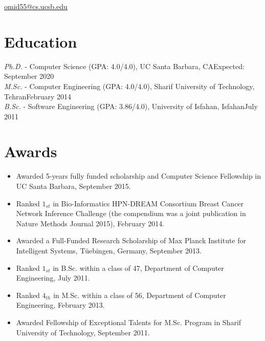 \documentclass[letter]{res}
\begin{document}
\newif \iflong
\longtrue     %

\address{+1 (805) 886 7101}
\address{6520 El Colegio Rd, Apt 2308, Santa Barbara, CA 93106} \href{mailto:omid55@cs.ucsb.edu}{omid55@cs.ucsb.edu}
\begin{resume}
  \noindent\makebox[\linewidth]{\rule{\paperwidth}{0.4pt}}


\section{Education}
{\sl Ph.D.} - Computer Science (GPA: 4.0/4.0), UC Santa Barbara, CA\hfill Expected: September 2020\vspace{-1mm}\\
{\sl M.Sc.} - Computer Engineering (GPA: 4.0/4.0), Sharif University of Technology, Tehran\hfill February 2014\vspace{-1mm}\\
{\sl B.Sc.} - Software Engineering (GPA: 3.86/4.0), University of Isfahan, Isfahan\hfill July 2011\vspace{-1mm}


\section{Awards} 
 \begin{itemize}
 \item Awarded 5-years fully funded scholarship and Computer Science Fellowship in UC Santa Barbara, September 2015.
 \item Ranked $1_{st}$ in Bio-Informatics HPN-DREAM Consortium Breast Cancer Network Inference Challenge (the compendium was a joint publication in Nature Methods Journal 2015), February 2014.
 \item Awarded a Full-Funded Research Scholarship of Max Planck Institute for Intelligent Systems, Tüebingen, Germany, September 2013.
 \item Ranked $1_{st}$ in B.Sc. within a class of 47, Department of Computer Engineering, July 2011.
 \item Ranked $4_{th}$ in M.Sc. within a class of 56, Department of Computer Engineering, February 2013.
 \item Awarded Fellowship of Exceptional Talents for M.Sc. Program in Sharif University of Technology, September 2011.
\end{itemize}



\end{resume}
\end{document}
